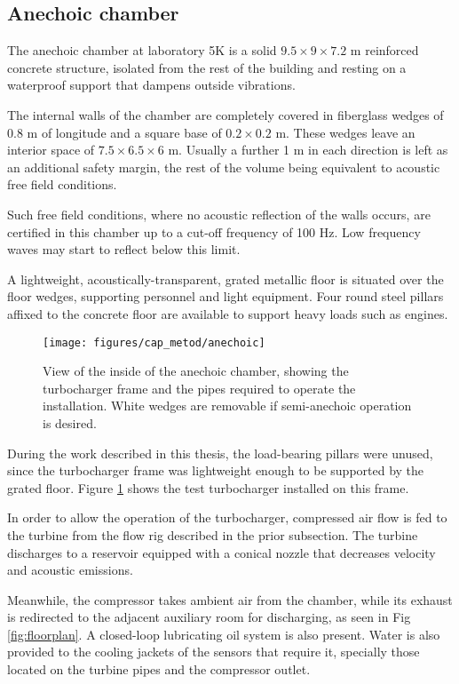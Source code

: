 \subsection{Anechoic chamber} \label{sub:anec_chamber}

The anechoic chamber at laboratory 5K is a solid $9.5 \times 9 \times 7.2$ m reinforced concrete structure, isolated from the rest of the building and resting on a waterproof support that dampens outside vibrations.

The internal walls of the chamber are completely covered in fiberglass wedges of 0.8 m of longitude and a square base of $0.2 \times 0.2$ m. These wedges leave an interior space of $7.5 \times 6.5 \times 6$ m. Usually a further 1 m in each direction is left as an additional safety margin, the rest of the volume being equivalent to acoustic free field conditions.

Such free field conditions, where no acoustic reflection of the walls occurs, are certified in this chamber up to a cut-off frequency of 100 Hz. Low frequency waves may start to reflect below this limit.

A lightweight, acoustically-transparent, grated metallic floor is situated over the floor wedges, supporting personnel and light equipment. Four round steel pillars affixed to the concrete floor are available to support heavy loads such as engines.

\begin{figure}[h!]
\centering
\texttt{[image: figures/cap\_metod/anechoic]}
\caption{View of the inside of the anechoic chamber, showing the turbocharger frame and the pipes required to operate the installation. White wedges are removable if semi-anechoic operation is desired.}
\label{fig:anechoic_chamber}
\end{figure}

During the work described in this thesis, the load-bearing pillars were unused, since the turbocharger frame was lightweight enough to be supported by the grated floor. Figure \ref{fig:anechoic_chamber} shows the test turbocharger installed on this frame.

In order to allow the operation of the turbocharger, compressed air flow is fed to the turbine from the flow rig described in the prior subsection. The turbine discharges to a reservoir equipped with a conical nozzle that decreases velocity and acoustic emissions.

Meanwhile, the compressor takes ambient air from the chamber, while its exhaust is redirected to the adjacent auxiliary room for discharging, as seen in Fig \ref{fig:floorplan}. A closed-loop lubricating oil system is also present. Water is also provided to the cooling jackets of the sensors that require it, specially those located on the turbine pipes and the compressor outlet.

